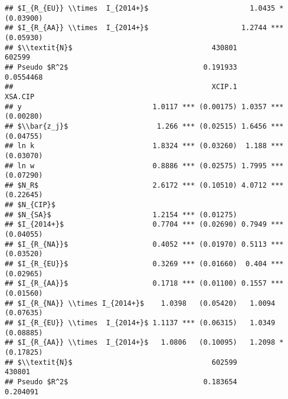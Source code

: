 \documentclass[
]{article}
\begin{document}
\begin{verbatim}
## $I_{R_{EU}} \\times  I_{2014+}$                        1.0435 * (0.03900)
## $I_{R_{AA}} \\times  I_{2014+}$                      1.2744 *** (0.05930)
## $\\textit{N}$                                 430801               602599
## Pseudo $R^2$                                0.191933            0.0554468
##                                               XCIP.1              XSA.CIP
## y                               1.0117 *** (0.00175) 1.0357 *** (0.00280)
## $\\bar{z_j}$                     1.266 *** (0.02515) 1.6456 *** (0.04755)
## ln k                            1.8324 *** (0.03260)  1.188 *** (0.03070)
## ln w                            0.8886 *** (0.02575) 1.7995 *** (0.07290)
## $N_R$                           2.6172 *** (0.10510) 4.0712 *** (0.22645)
## $N_{CIP}$                                                                
## $N_{SA}$                        1.2154 *** (0.01275)                     
## $I_{2014+}$                     0.7704 *** (0.02690) 0.7949 *** (0.04055)
## $I_{R_{NA}}$                    0.4052 *** (0.01970) 0.5113 *** (0.03520)
## $I_{R_{EU}}$                    0.3269 *** (0.01660)  0.404 *** (0.02965)
## $I_{R_{AA}}$                    0.1718 *** (0.01100) 0.1557 *** (0.01560)
## $I_{R_{NA}} \\times I_{2014+}$    1.0398   (0.05420)   1.0094   (0.07635)
## $I_{R_{EU}} \\times  I_{2014+}$ 1.1137 *** (0.06315)   1.0349   (0.08885)
## $I_{R_{AA}} \\times  I_{2014+}$   1.0806   (0.10095)   1.2098 * (0.17825)
## $\\textit{N}$                                 602599               430801
## Pseudo $R^2$                                0.183654             0.204091
\end{verbatim}
\end{document}
